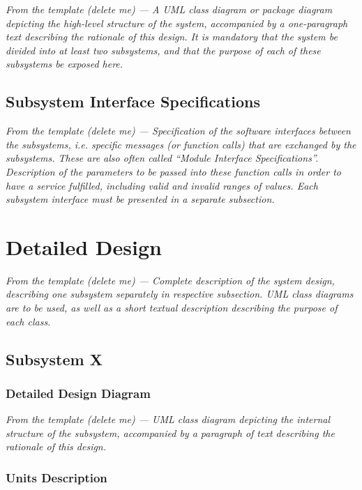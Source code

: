 \documentclass[12pt]{article}
\begin{document}
\textit {From the template (delete me) --- A UML class diagram or package diagram depicting the high-level structure of the system, accompanied by a one-paragraph text describing the rationale of this design. It is mandatory that the system be divided into at least two subsystems, and that the purpose of each of these subsystems be exposed here.}

\subsection{Subsystem Interface Specifications}

\textit {From the template (delete me) --- Specification of the software interfaces between the subsystems, i.e. specific messages (or function calls) that are exchanged by the subsystems. These are also often called ``Module Interface Specifications''.
Description of the parameters to be passed into these function calls in order to have a service fulfilled, including valid and invalid ranges of values. Each subsystem interface must be presented in a separate subsection.}

\section{Detailed Design} \label{sec:detail}

\textit {From the template (delete me) --- Complete description of the system design, describing one subsystem separately in respective subsection. UML class diagrams are to be used, as well as a short textual description describing the purpose of each class.}

\subsection{Subsystem X}

\subsubsection{Detailed Design Diagram}

\textit {From the template (delete me) --- UML class diagram depicting the internal structure of the subsystem, accompanied by a paragraph of text describing the rationale of this design.}

\subsubsection{Units Description}
\end{document}
